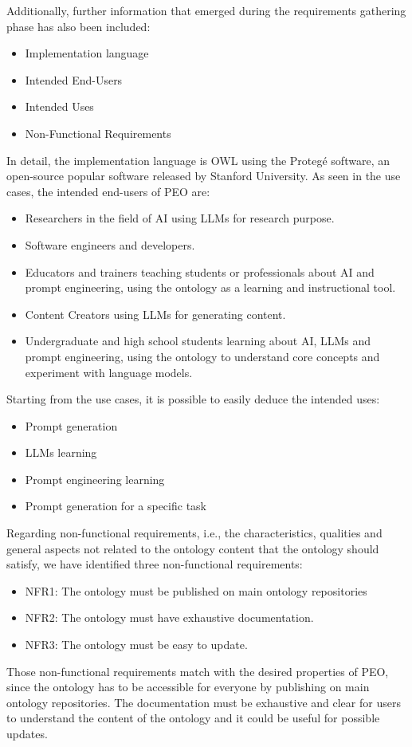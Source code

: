 Additionally, further information that emerged during the requirements gathering phase has also been included:
\begin{itemize}
    \item Implementation language 
    \item Intended End-Users 
    \item Intended Uses
    \item Non-Functional Requirements
\end{itemize}
In detail, the implementation language is OWL using the Protegé software\cite{protege_sw}, an open-source popular software released by Stanford University.
As seen in the use cases, the intended end-users of PEO are:
\begin{itemize}
    \item Researchers in the field of AI using LLMs for research purpose.
    \item Software engineers and developers.
    \item Educators and trainers teaching students or professionals about AI and prompt engineering, using the ontology as a learning and instructional tool.
    \item Content Creators using LLMs for generating content.
    \item Undergraduate and high school students learning about AI, LLMs and prompt engineering, using the ontology to understand core concepts and experiment with language models.
\end{itemize}
Starting from the use cases, it is possible to easily deduce the intended uses:
\begin{itemize}
    \item Prompt generation
    \item LLMs learning
    \item Prompt engineering learning
    \item Prompt generation for a specific task
\end{itemize}
Regarding non-functional requirements, i.e., the characteristics, qualities and general aspects not related to the ontology content that the ontology should satisfy, we have identified three non-functional requirements:
\begin{itemize}
    \item NFR1: The ontology must be published on main ontology repositories
    \item NFR2: The ontology must have exhaustive documentation.
    \item NFR3: The ontology must be easy to update.
\end{itemize}
Those non-functional requirements match with the desired properties of PEO, since the ontology has to be accessible for everyone by publishing on main ontology repositories. The documentation  must be exhaustive and clear for users to understand the content of the ontology and it could be useful for possible updates.




